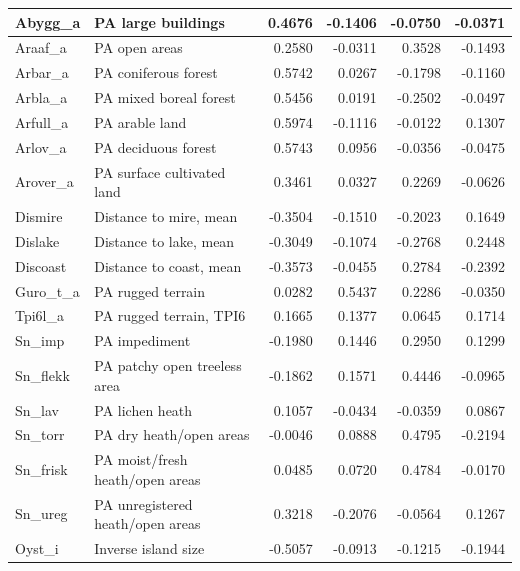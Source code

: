 \documentclass[]{article}
\begin{document}
\begin{table}[H]
\begin{tabular}{l|l|r|r|r|r}
\hline
Abygg\_a & PA large buildings & 0.4676 & -0.1406 & -0.0750 & -0.0371\\
\hline
Araaf\_a & PA open areas & 0.2580 & -0.0311 & 0.3528 & -0.1493\\
\hline
Arbar\_a & PA coniferous forest & 0.5742 & 0.0267 & -0.1798 & -0.1160\\
\hline
Arbla\_a & PA mixed boreal forest & 0.5456 & 0.0191 & -0.2502 & -0.0497\\
\hline
Arfull\_a & PA arable land & 0.5974 & -0.1116 & -0.0122 & 0.1307\\
\hline
Arlov\_a & PA deciduous forest & 0.5743 & 0.0956 & -0.0356 & -0.0475\\
\hline
Arover\_a & PA surface cultivated land & 0.3461 & 0.0327 & 0.2269 & -0.0626\\
\hline
Dismire & Distance to mire, mean & -0.3504 & -0.1510 & -0.2023 & 0.1649\\
\hline
Dislake & Distance to lake, mean & -0.3049 & -0.1074 & -0.2768 & 0.2448\\
\hline
Discoast & Distance to coast, mean & -0.3573 & -0.0455 & 0.2784 & -0.2392\\
\hline
Guro\_t\_a & PA rugged terrain & 0.0282 & 0.5437 & 0.2286 & -0.0350\\
\hline
Tpi6l\_a & PA rugged terrain, TPI6 & 0.1665 & 0.1377 & 0.0645 & 0.1714\\
\hline
Sn\_imp & PA impediment & -0.1980 & 0.1446 & 0.2950 & 0.1299\\
\hline
Sn\_flekk & PA patchy open treeless area & -0.1862 & 0.1571 & 0.4446 & -0.0965\\
\hline
Sn\_lav & PA lichen heath & 0.1057 & -0.0434 & -0.0359 & 0.0867\\
\hline
Sn\_torr & PA dry heath/open areas & -0.0046 & 0.0888 & 0.4795 & -0.2194\\
\hline
Sn\_frisk & PA moist/fresh heath/open areas & 0.0485 & 0.0720 & 0.4784 & -0.0170\\
\hline
Sn\_ureg & PA unregistered heath/open areas & 0.3218 & -0.2076 & -0.0564 & 0.1267\\
\hline
Oyst\_i & Inverse island size & -0.5057 & -0.0913 & -0.1215 & -0.1944\\
\hline
\end{tabular}
\end{table}
\end{document}
